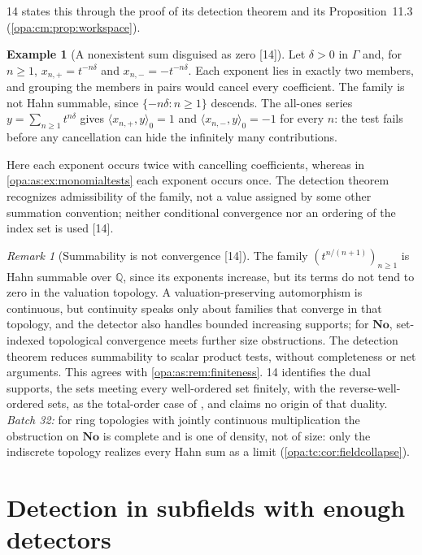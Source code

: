 \documentclass[11pt,oneside]{article}
\numberwithin{equation}{section}
\theoremstyle{definition}
\newtheorem{example}[example]{Example}
\theoremstyle{remark}
\newtheorem{remark}[remark]{Remark}
\newcommand{\No}{\mathbf{No}}
\newcommand{\Q}{\mathbb Q}
\newcommand{\src}[1]{\textup{\textsf{\small[#1]}}}
\newcommand{\pairing}[2]{\langle #1,#2\rangle_0}
\begin{document}
14 states this through the proof of its detection theorem and its Proposition~11.3
(\cref{opa:cm:prop:workspace}).

\begin{example}[A nonexistent sum disguised as zero \src{14}]\label{opa:cm:ex:cancellation}
Let $\delta>0$ in $\Gamma$ and, for $n\ge1$, $x_{n,+}=t^{-n\delta}$ and $x_{n,-}=-t^{-n\delta}$. Each exponent
lies in exactly two members, and grouping the members in pairs would cancel every
coefficient. The family is not Hahn summable, since $\{-n\delta:n\ge1\}$ descends. The all-ones
series $y=\sum_{n\ge1}t^{n\delta}$ gives $\pairing{x_{n,+}}y=1$ and $\pairing{x_{n,-}}y=-1$ for every
$n$: the test fails before any cancellation can hide the infinitely many contributions.
\end{example}

Here each exponent occurs twice with cancelling coefficients, whereas in
\cref{opa:as:ex:monomialtests} each exponent occurs once. The detection theorem recognizes
admissibility of the family, not a value assigned by some other summation convention;
neither conditional convergence nor an ordering of the index set is used \src{14}.

\begin{remark}[Summability is not convergence \src{14}]\label{opa:cm:rem:topology}
The family $(t^{n/(n+1)})_{n\ge1}$ is Hahn summable over $\Q$, since its exponents increase,
but its terms do not tend to zero in the valuation topology. A valuation-preserving
automorphism is continuous, but continuity speaks only about families that converge in that
topology, and the detector also handles bounded increasing supports; for $\No$, set-indexed
topological convergence meets further size obstructions. The detection theorem reduces
summability to scalar product tests, without completeness or net arguments. This agrees
with \cref{opa:as:rem:finiteness}. 14 identifies the dual supports, the sets meeting every
well-ordered set finitely, with the reverse-well-ordered sets, as the total-order case of
\cite[Theorem~3 and Lemmas~4.1--4.2]{BCJS}, and claims no origin of that duality.
\emph{Batch 32:} for ring topologies with jointly continuous multiplication the obstruction on
$\No$ is complete and is one of density, not of size: only the indiscrete topology realizes every
Hahn sum as a limit (\cref{opa:tc:cor:fieldcollapse}).
\end{remark}

\section{Detection in subfields with enough detectors}\label{opa:cm:sec:workspaces}
\end{document}
